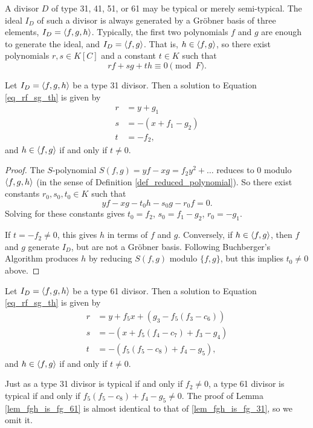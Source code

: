 A divisor $D$ of type 31, 41, 51, or 61 may be typical or merely semi-typical.
The ideal $I_D$ of such a divisor is always generated by a Gr\"obner basis of three elements, $I_D = \left\langle f,g,h \right\rangle$.
Typically, the first two polynomials $f$ and $g$ are enough to generate the ideal, and $I_D = \left\langle f,g \right\rangle$.
That is, $h \in \left\langle f,g \right\rangle$, so there exist polynomials $r, s \in K[C]$ and a constant $t \in K$ such that
\begin{equation}
  \label{eq_rf_sg_th}
  rf + sg + th \equiv 0 \pmod F.
\end{equation}
\begin{lemma}
  \label{lem_fgh_is_fg_31}
  Let $I_D = \left\langle f,g,h \right\rangle$ be a type 31 divisor.
  Then a solution to Equation \ref{eq_rf_sg_th} is given by
  \begin{align*}
    r &= y + g_1 \\
    s &= -(x + f_1 - g_2) \\
    t &= -f_2,
  \end{align*}
  and $h \in \left\langle f,g \right\rangle$ if and only if $t \neq 0$.
\end{lemma}
\begin{proof}
  The $S$-polynomial $S(f, g) = yf - xg = f_2y^2 + \ldots$ reduces to 0 modulo $\left\langle f,g,h \right\rangle$
  (in the sense of Definition \ref{def_reduced_polynomial}).
  So there exist constants $r_0, s_0, t_0 \in K$ such that 
  \[ yf - xg - t_0h - s_0g - r_0f = 0. \]
  Solving for these constants gives $t_0 = f_2$, $s_0 = f_1 - g_2$, $r_0 = -g_1$.
  
  If $t = -f_2 \neq 0$, this gives $h$ in terms of $f$ and $g$.
  Conversely, if $h \in \left\langle f,g \right\rangle$, then $f$ and $g$ generate $I_D$, but are not a Gr\"obner basis.
  Following Buchberger's Algorithm 
  produces $h$ by reducing $S(f,g)$ modulo $\{f,g\}$, but this implies $t_0 \neq 0$ above.
\end{proof}
\begin{lemma}
  \label{lem_fgh_is_fg_61}
  Let $I_D = \left\langle f,g,h \right\rangle$ be a type 61 divisor.
  Then a solution to Equation \ref{eq_rf_sg_th} is given by
  \begin{align*}
    r &= y + f_5x + (g_3 - f_5(f_3 - c_6)) \\
    s &= -(x + f_5(f_4 - c_7) + f_3 - g_4) \\
    t &= -(f_5(f_5 - c_8) + f_4 - g_5),
  \end{align*}
  and $h \in \left\langle f,g \right\rangle$ if and only if $t \neq 0$.
\end{lemma}
Just as a type 31 divisor is typical if and only if $f_2 \neq 0$,
a type 61 divisor is typical if and only if $f_5(f_5 - c_8) + f_4 - g_5 \neq 0$.
The proof of Lemma \ref{lem_fgh_is_fg_61} is almost identical to that of \ref{lem_fgh_is_fg_31}, so we omit it.

